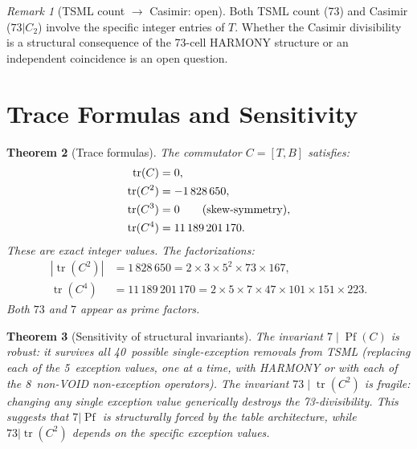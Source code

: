 \documentclass[11pt]{article}
\newtheorem{theorem}{Theorem}[section]
\theoremstyle{definition}
\theoremstyle{remark}
\newtheorem{remark}[theorem]{Remark}
\begin{document}
\begin{remark}[TSML count $\to$ Casimir: open]
\label{rem:73-casimir}
Both TSML count (73) and Casimir ($73 | C_2$) involve the specific integer
entries of $T$.  Whether the Casimir divisibility is a structural consequence of
the 73-cell HARMONY structure or an independent coincidence is an open question.
\end{remark}

\section{Trace Formulas and Sensitivity}
\label{sec:trace-sensitivity}

\begin{theorem}[Trace formulas]
\label{thm:trace-formulas}
The commutator $C = [T,B]$ satisfies:
\begin{align}
  \operatorname{tr}(C) &= 0, \\
  \operatorname{tr}(C^2) &= -1\,828\,650, \\
  \operatorname{tr}(C^3) &= 0 \qquad\textup{(skew-symmetry)}, \\
  \operatorname{tr}(C^4) &= 11\,189\,201\,170.
\end{align}
These are exact integer values.  The factorizations:
\begin{align}
  |\operatorname{tr}(C^2)| &= 1\,828\,650 = 2 \times 3 \times 5^2 \times 73
  \times 167, \\
  \operatorname{tr}(C^4) &= 11\,189\,201\,170 = 2 \times 5 \times 7 \times 47
  \times 101 \times 151 \times 223.
\end{align}
Both $73$ and $7$ appear as prime factors.
\end{theorem}

\begin{theorem}[Sensitivity of structural invariants]
\label{thm:sensitivity}
The invariant $7 \mid \operatorname{Pf}(C)$ is robust: it survives all
40~possible single-exception removals from TSML (replacing each of the
5~exception values, one at a time, with HARMONY or with each of the 8~non-VOID
non-exception operators).  The invariant $73 \mid \operatorname{tr}(C^2)$ is
fragile: changing any single exception value generically destroys the
73-divisibility.  This suggests that $7 | \operatorname{Pf}$ is structurally
forced by the table architecture, while $73 | \operatorname{tr}(C^2)$ depends
on the specific exception values.
\end{theorem}
\end{document}
